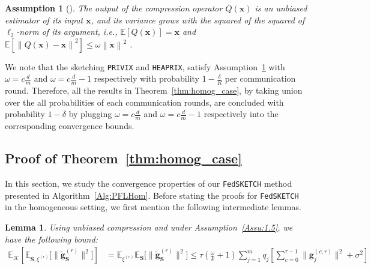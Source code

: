 \documentclass{article}
\newtheorem{lemma}{Lemma}
\newtheorem{assumption}{Assumption}
\begin{document}
\begin{assumption}[\citep{haddadpour2020federated}]\label{Assu:quant}
The output of the compression operator $Q(\boldsymbol{x})$ is an unbiased estimator of its input $\boldsymbol{x}$, and its variance grows with the squared of the squared of $\ell_2$-norm of its argument, i.e., $\mathbb{E}\left[Q(\boldsymbol{x})\right]=\boldsymbol{x}$ and $\mathbb{E}\left[\left\|Q(\boldsymbol{x})-\boldsymbol{x}\right\|^2\right]\leq \omega\left\|\boldsymbol{x}\right\|^2$ .
\end{assumption}
We note that the sketching \texttt{PRIVIX} and \texttt{HEAPRIX}, satisfy Assumption~\ref{Assu:quant} with $\omega=c \frac{d}{m}$ and $\omega=c\frac{d}{m}-1$ respectively with probability $1-\frac{\delta}{R}$ per communication round. 
Therefore, all the results in Theorem~\ref{thm:homog_case}, by taking union over the all probabilities of each communication rounds, are concluded with probability $1-\delta$  by plugging $\omega=c\frac{d}{m}$ and $\omega=c\frac{d}{m}-1$ respectively into the corresponding convergence bounds.

\subsection{Proof of Theorem~\ref{thm:homog_case}}

In this section, we study the convergence properties of our  \texttt{FedSKETCH} method presented in Algorithm~\ref{Alg:PFLHom}. Before stating the proofs for \texttt{FedSKETCH} in the homogeneous setting, we first mention the following intermediate lemmas. 


\begin{lemma}\label{lemma:tasbih1-iid}
Using unbiased compression and under Assumption~\ref{Assu:1.5}, we have the following bound: 
\begin{align}
\mathbb{E}_{\mathcal{K}}\left[\mathbb{E}_{{\mathbf{S},\xi^{(r)}}}\Big[\|\tilde{\mathbf{g}}_{\mathbf{S}}^{(r)}\|^2\Big]\right]&=\mathbb{E}_{{\xi}^{(r)}}\mathbb{E}_{\mathbf{S}}\Big[\|\tilde{\mathbf{g}}_\mathbf{S}^{(r)}\|^2\Big]\leq \tau(\frac{\omega}{k}+1)\sum_{j=1}^mq_j\left[\sum_{c=0}^{\tau-1}\|\mathbf{g}_j^{(c,r)}\|^2+\sigma^2\right] \label{eq:lemma1}
\end{align}
\end{lemma}
\end{document}
